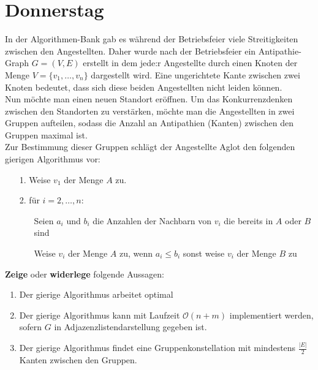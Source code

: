 \documentclass{uebung_cs}
\begin{document}
\section*{Donnerstag}
\begin{aufgabe}[Antipathien]
    In der Algorithmen-Bank gab es während der Betriebsfeier viele Streitigkeiten zwischen den Angestellten. Daher wurde nach der Betriebsfeier ein Antipathie-Graph $G=(V,E)$ erstellt in dem jede:r Angestellte durch einen Knoten der Menge $V=\{v_1,\ldots , v_n\}$ dargestellt wird. Eine ungerichtete Kante zwischen zwei Knoten bedeutet, dass sich diese beiden Angestellten nicht leiden können.\\
    Nun möchte man einen neuen Standort eröffnen. Um das Konkurrenzdenken zwischen den Standorten zu verstärken, möchte man die Angestellten in zwei Gruppen aufteilen, sodass die Anzahl an Antipathien (Kanten) zwischen den Gruppen maximal ist.\\
    Zur Bestimmung dieser Gruppen schlägt der Angestellte Aglot den folgenden gierigen Algorithmus vor:
    \begin{enumerate}
        \item[1.] Weise $v_1$ der Menge $A$ zu.
        \item[2.] für $i=2,\ldots , n$:
        \begin{itemize}
            \item[] Seien $a_i$ und $b_i$ die Anzahlen der Nachbarn von $v_i$ die bereits in $A$ oder $B$ sind
            \item[] Weise $v_i$ der Menge $A$ zu, wenn $a_i \leq b_i$ sonst weise $v_i$ der Menge $B$ zu 
        \end{itemize}
    \end{enumerate}
    \textbf{Zeige} oder \textbf{widerlege} folgende Aussagen:
    \begin{enumerate}[label=(\alph*)]
        \item Der gierige Algorithmus arbeitet optimal
        \item Der gierige Algorithmus kann mit Laufzeit $\mathcal{O}(n+m)$ implementiert werden, sofern $G$ in Adjazenzlistendarstellung gegeben ist.
        \item Der gierige Algorithmus findet eine Gruppenkonstellation mit mindestens $\frac{|E|}{2}$ Kanten zwischen den Gruppen.
    \end{enumerate}
\end{aufgabe}
\end{document}
